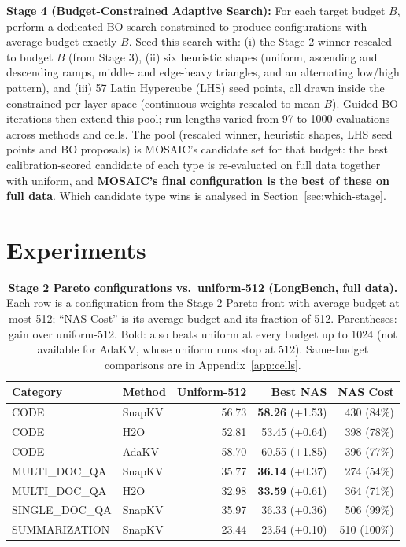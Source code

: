 \documentclass[11pt]{article}
\begin{document}
\textbf{Stage 4 (Budget-Constrained Adaptive Search):} For each target budget $B$, perform a dedicated BO search constrained to produce configurations with average budget exactly $B$. Seed this search with: (i) the Stage 2 winner rescaled to budget $B$ (from Stage 3), (ii) six heuristic shapes (uniform, ascending and descending ramps, middle- and edge-heavy triangles, and an alternating low/high pattern), and (iii) 57 Latin Hypercube (LHS) seed points, all drawn inside the constrained per-layer space (continuous weights rescaled to mean $B$). Guided BO iterations then extend this pool; run lengths varied from 97 to 1000 evaluations across methods and cells. The pool (rescaled winner, heuristic shapes, LHS seed points and BO proposals) is MOSAIC's candidate set for that budget: the best calibration-scored candidate of each type is re-evaluated on full data together with uniform, and \textbf{MOSAIC's final configuration is the best of these on full data}. Which candidate type wins is analysed in Section~\ref{sec:which-stage}.


\section{Experiments}

\begin{table}[t]
  \centering
  \small
  \setlength{\tabcolsep}{12pt}
  \begin{tabular}{@{} l l r r r @{}}
    \toprule
    \textbf{Category} & \textbf{Method} & \textbf{Uniform-512} & \textbf{Best NAS} & \textbf{NAS Cost} \\
    \midrule
    \rowcolor{gray!10}
    CODE & SnapKV & 56.73 & \textbf{58.26} (+1.53) & 430 (84\%) \\
    CODE & H2O & 52.81 & 53.45 (+0.64) & 398 (78\%) \\
    \rowcolor{gray!10}
    CODE & AdaKV & 58.70 & 60.55 (+1.85) & 396 (77\%) \\
    MULTI\_DOC\_QA & SnapKV & 35.77 & \textbf{36.14} (+0.37) & 274 (54\%) \\
    \rowcolor{gray!10}
    MULTI\_DOC\_QA & H2O & 32.98 & \textbf{33.59} (+0.61) & 364 (71\%) \\
    SINGLE\_DOC\_QA & SnapKV & 35.97 & 36.33 (+0.36) & 506 (99\%) \\
    \rowcolor{gray!10}
    SUMMARIZATION & SnapKV & 23.44 & 23.54 (+0.10) & 510 (100\%) \\
    \bottomrule
  \end{tabular}
  \caption{\textbf{Stage 2 Pareto configurations vs.\ uniform-512 (LongBench, full data).} Each row is a configuration from the Stage 2 Pareto front with average budget at most 512; ``NAS Cost'' is its average budget and its fraction of 512. Parentheses: gain over uniform-512. Bold: also beats uniform at every budget up to 1024 (not available for AdaKV, whose uniform runs stop at 512). Same-budget comparisons are in Appendix~\ref{app:cells}.}
  \label{tab:longbench-summary}
\end{table}
\end{document}
